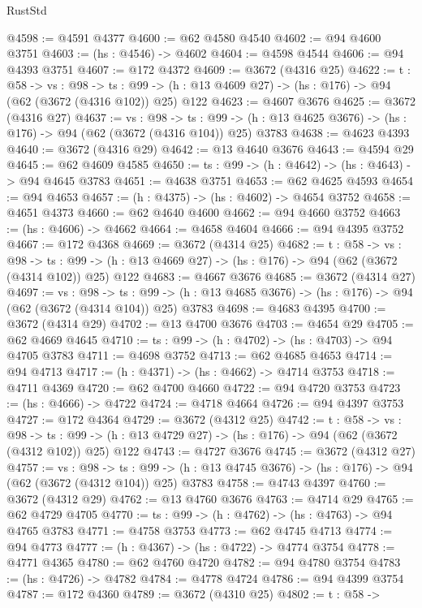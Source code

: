\begin{lexlean}{RustStd}
\begin{coremodule}
@4598 := @4591 @4377
@4600 := @62 @4580 @4540
@4602 := @94 @4600 @3751
@4603 := (hs : @4546) -> @4602
@4604 := @4598 @4544
@4606 := @94 @4393 @3751
@4607 := @172 @4372
@4609 := @3672 (@4316 @25)
@4622 := {t : @58} ->
  {vs : @98} ->
  {ts : @99} -> (h : @13 @4609 @27) -> (hs : @176) -> @94 (@62 (@3672 (@4316 @102)) @25) @122
@4623 := @4607 @3676
@4625 := @3672 (@4316 @27)
@4637 := {vs : @98} ->
  {ts : @99} -> (h : @13 @4625 @3676) -> (hs : @176) -> @94 (@62 (@3672 (@4316 @104)) @25) @3783
@4638 := @4623 @4393
@4640 := @3672 (@4316 @29)
@4642 := @13 @4640 @3676
@4643 := @4594 @29
@4645 := @62 @4609 @4585
@4650 := {ts : @99} -> (h : @4642) -> (hs : @4643) -> @94 @4645 @3783
@4651 := @4638 @3751
@4653 := @62 @4625 @4593
@4654 := @94 @4653
@4657 := (h : @4375) -> (hs : @4602) -> @4654 @3752
@4658 := @4651 @4373
@4660 := @62 @4640 @4600
@4662 := @94 @4660 @3752
@4663 := (hs : @4606) -> @4662
@4664 := @4658 @4604
@4666 := @94 @4395 @3752
@4667 := @172 @4368
@4669 := @3672 (@4314 @25)
@4682 := {t : @58} ->
  {vs : @98} ->
  {ts : @99} -> (h : @13 @4669 @27) -> (hs : @176) -> @94 (@62 (@3672 (@4314 @102)) @25) @122
@4683 := @4667 @3676
@4685 := @3672 (@4314 @27)
@4697 := {vs : @98} ->
  {ts : @99} -> (h : @13 @4685 @3676) -> (hs : @176) -> @94 (@62 (@3672 (@4314 @104)) @25) @3783
@4698 := @4683 @4395
@4700 := @3672 (@4314 @29)
@4702 := @13 @4700 @3676
@4703 := @4654 @29
@4705 := @62 @4669 @4645
@4710 := {ts : @99} -> (h : @4702) -> (hs : @4703) -> @94 @4705 @3783
@4711 := @4698 @3752
@4713 := @62 @4685 @4653
@4714 := @94 @4713
@4717 := (h : @4371) -> (hs : @4662) -> @4714 @3753
@4718 := @4711 @4369
@4720 := @62 @4700 @4660
@4722 := @94 @4720 @3753
@4723 := (hs : @4666) -> @4722
@4724 := @4718 @4664
@4726 := @94 @4397 @3753
@4727 := @172 @4364
@4729 := @3672 (@4312 @25)
@4742 := {t : @58} ->
  {vs : @98} ->
  {ts : @99} -> (h : @13 @4729 @27) -> (hs : @176) -> @94 (@62 (@3672 (@4312 @102)) @25) @122
@4743 := @4727 @3676
@4745 := @3672 (@4312 @27)
@4757 := {vs : @98} ->
  {ts : @99} -> (h : @13 @4745 @3676) -> (hs : @176) -> @94 (@62 (@3672 (@4312 @104)) @25) @3783
@4758 := @4743 @4397
@4760 := @3672 (@4312 @29)
@4762 := @13 @4760 @3676
@4763 := @4714 @29
@4765 := @62 @4729 @4705
@4770 := {ts : @99} -> (h : @4762) -> (hs : @4763) -> @94 @4765 @3783
@4771 := @4758 @3753
@4773 := @62 @4745 @4713
@4774 := @94 @4773
@4777 := (h : @4367) -> (hs : @4722) -> @4774 @3754
@4778 := @4771 @4365
@4780 := @62 @4760 @4720
@4782 := @94 @4780 @3754
@4783 := (hs : @4726) -> @4782
@4784 := @4778 @4724
@4786 := @94 @4399 @3754
@4787 := @172 @4360
@4789 := @3672 (@4310 @25)
@4802 := {t : @58} ->

\end{coremodule}
\end{lexlean}
